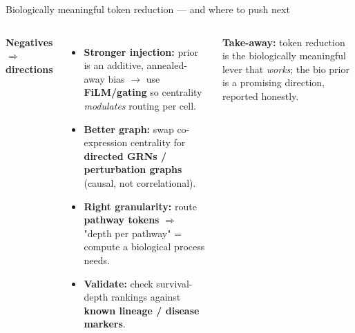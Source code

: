 \documentclass[aspectratio=169,11pt]{beamer}
\newcommand{\good}[1]{\textcolor{accentA}{\textbf{#1}}}
\begin{document}
\begin{frame}{Biologically meaningful token reduction --- and where to push next}
\begin{columns}[T]
\textbf{\footnotesize Negatives $\Rightarrow$ directions}
\begin{itemize}\footnotesize
  \item \good{Stronger injection:} prior is an additive, annealed-away bias $\to$ use \good{FiLM/gating} so centrality \emph{modulates} routing per cell.
  \item \good{Better graph:} swap co-expression centrality for \good{directed GRNs / perturbation graphs} (causal, not correlational).
  \item \good{Right granularity:} route \good{pathway tokens} $\Rightarrow$ "depth per pathway" = compute a biological process needs.
  \item \good{Validate:} check survival-depth rankings against \good{known lineage / disease markers}.
\end{itemize}
\vspace{1mm}
{\footnotesize\good{Take-away:} token reduction is the biologically meaningful lever that \emph{works}; the bio prior is a promising direction, reported honestly.}
\end{columns}
\end{frame}
\end{document}
